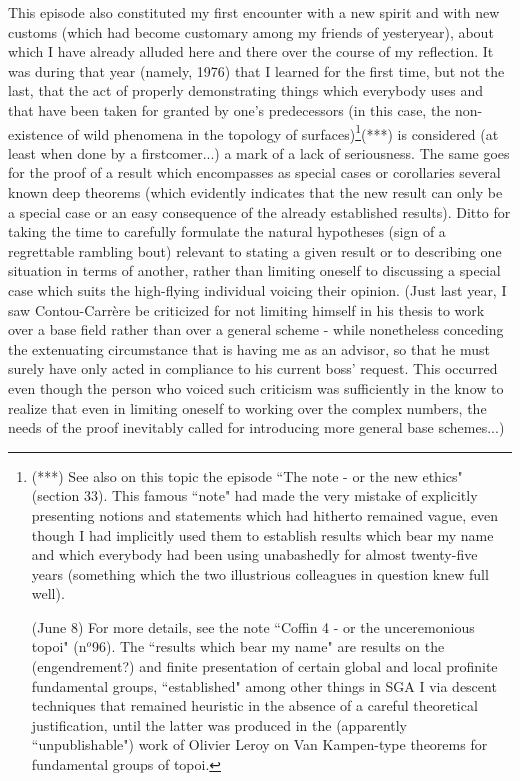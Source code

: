 This episode also constituted my first encounter with a new spirit and with new customs (which had become customary among my friends of yesteryear), about which I have already alluded here and there over the course of my reflection. It was during that year (namely, 1976) that I learned for the first time, but not the last, that the act of properly demonstrating things which everybody uses and that have been taken for granted by one's predecessors (in this case, the non-existence of wild phenomena in the topology of surfaces)\footnote{(***) See also on this topic the episode ``The note - or the new ethics" (section 33). This famous ``note" had made the very mistake of explicitly presenting notions and statements which had hitherto remained vague, even though I had implicitly used them to establish results which bear my name and which everybody had been using unabashedly for almost twenty-five years (something which the two illustrious colleagues in question knew full well).

(June 8) For more details, see the note ``Coffin 4 - or the unceremonious topoi" (n$^o$96). The ``results which bear my name" are results on the (engendrement?) and finite presentation of certain global and local profinite fundamental groups, ``established" among other things in SGA I via descent techniques that remained heuristic in the absence of a careful theoretical justification, until the latter was produced in the (apparently ``unpublishable") work of Olivier Leroy on Van Kampen-type theorems for fundamental groups of topoi.}(***) 
is considered (at least when done by a firstcomer...) a mark of a lack of seriousness. The same goes for the proof of a result which encompasses as special cases or corollaries several known deep theorems (which evidently indicates that the new result can only be a special case or an easy consequence of the already established results). Ditto for taking the time to carefully formulate the natural hypotheses (sign of a regrettable rambling bout) relevant to stating a given result or to describing one situation in terms of another, rather than limiting oneself to discussing a special case which suits the high-flying individual voicing their opinion. (Just last year, I saw Contou-Carr\`ere be criticized for not limiting himself in his thesis to work over a base field rather than over a general scheme - while nonetheless conceding the extenuating circumstance that is having me as an advisor, so that he must surely have only acted in compliance to his current boss' request. This occurred even though the person who voiced such criticism was sufficiently in the know to realize that even in limiting oneself to working over the complex numbers, the needs of the proof inevitably called for introducing more general base schemes...)

